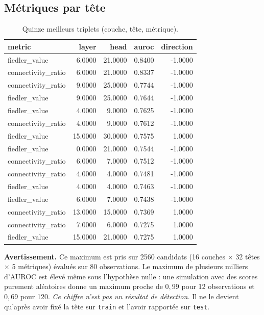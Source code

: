 \documentclass[11pt,a4paper]{article}
\begin{document}
\subsection{Métriques par tête}

\begin{table}[htbp]
\centering
\small
\begin{tabular}{lrrrr}
\hline
metric & layer & head & auroc & direction \\
\hline
fiedler\_value & 6.0000 & 21.0000 & 0.8400 & -1.0000 \\
connectivity\_ratio & 6.0000 & 21.0000 & 0.8337 & -1.0000 \\
connectivity\_ratio & 9.0000 & 25.0000 & 0.7744 & -1.0000 \\
fiedler\_value & 9.0000 & 25.0000 & 0.7644 & -1.0000 \\
fiedler\_value & 4.0000 & 9.0000 & 0.7625 & -1.0000 \\
connectivity\_ratio & 4.0000 & 9.0000 & 0.7612 & -1.0000 \\
fiedler\_value & 15.0000 & 30.0000 & 0.7575 & 1.0000 \\
fiedler\_value & 0.0000 & 21.0000 & 0.7544 & -1.0000 \\
connectivity\_ratio & 6.0000 & 7.0000 & 0.7512 & -1.0000 \\
connectivity\_ratio & 4.0000 & 4.0000 & 0.7481 & -1.0000 \\
fiedler\_value & 4.0000 & 4.0000 & 0.7463 & -1.0000 \\
fiedler\_value & 6.0000 & 7.0000 & 0.7438 & -1.0000 \\
connectivity\_ratio & 13.0000 & 15.0000 & 0.7369 & 1.0000 \\
connectivity\_ratio & 7.0000 & 6.0000 & 0.7275 & 1.0000 \\
fiedler\_value & 15.0000 & 21.0000 & 0.7275 & 1.0000 \\
\hline
\end{tabular}
\caption{Quinze meilleurs triplets (couche, tête, métrique).}
\label{tab:heads}
\end{table}


\textbf{Avertissement.} Ce maximum est pris sur 2560 candidats
(16 couches $\times$ 32 têtes
$\times$ 5 métriques) évalués sur 80
observations. Le maximum de plusieurs milliers d'AUROC est élevé même sous
l'hypothèse nulle : une simulation avec des scores purement aléatoires donne
un maximum proche de $0{,}99$ pour 12 observations et $0{,}69$ pour 120.
\emph{Ce chiffre n'est pas un résultat de détection.} Il ne le devient
qu'après avoir fixé la tête sur \texttt{train} et l'avoir rapportée sur
\texttt{test}.
\end{document}
